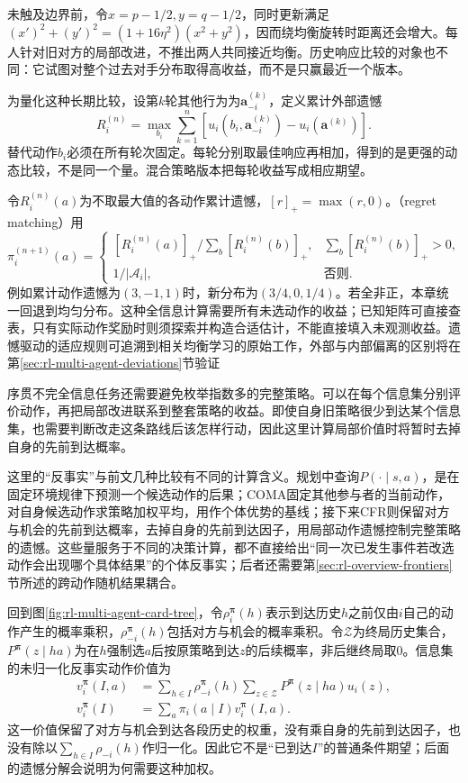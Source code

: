 未触及边界前，令$x=p-1/2,y=q-1/2$，同时更新满足
$(x')^2+(y')^2=(1+16\eta^2)(x^2+y^2)$，因而绕均衡旋转时距离还会增大。每人针对旧对方的局部改进，不推出两人共同接近均衡。历史响应比较的对象也不同：它试图对整个过去对手分布取得高收益，而不是只赢最近一个版本。

为量化这种长期比较，设第$k$轮其他行为为$\bm a_{-i}^{(k)}$，定义累计外部遗憾
\begin{equation}
 R_i^{(n)}
 =\max_{b_i}\sum_{k=1}^{n}
   [u_i(b_i,\bm a_{-i}^{(k)})
        -u_i(\bm a^{(k)})].
 \label{eq:rl-multi-agent-external-regret}
\end{equation}
替代动作$b_i$必须在所有轮次固定。每轮分别取最佳响应再相加，得到的是更强的动态比较，不是同一个量。混合策略版本把每轮收益写成相应期望。

令$R_i^{(n)}(a)$为不取最大值的各动作累计遗憾，$[r]_+=\max(r,0)$。（regret matching）用
\[
 \pi_i^{(n+1)}(a)=
 \begin{cases}
 [R_i^{(n)}(a)]_+/\sum_b[R_i^{(n)}(b)]_+,
       &\sum_b[R_i^{(n)}(b)]_+>0,\\
 1/|\mathcal A_i|,&\text{否则}.
 \end{cases}
\]
例如累计动作遗憾为$(3,-1,1)$时，新分布为$(3/4,0,1/4)$。若全非正，本章统一回退到均匀分布。这种全信息计算需要所有未选动作的收益；已知矩阵可直接查表，只有实际动作奖励时则须探索并构造合适估计，不能直接填入未观测收益。遗憾驱动的适应规则可追溯到相关均衡学习的原始工作，外部与内部偏离的区别将在第\ref{sec:rl-multi-agent-deviations}节验证

序贯不完全信息任务还需要避免枚举指数多的完整策略。可以在每个信息集分别评价动作，再把局部改进联系到整套策略的收益。即使自身旧策略很少到达某个信息集，也需要判断改走这条路线后该怎样行动，因此这里计算局部价值时将暂时去掉自身的先前到达概率。

这里的“反事实”与前文几种比较有不同的计算含义。规划中查询$P(\cdot\mid s,a)$，是在固定环境规律下预测一个候选动作的后果；COMA固定其他参与者的当前动作，对自身候选动作求策略加权平均，用作个体优势的基线；接下来CFR则保留对方与机会的先前到达概率，去掉自身的先前到达因子，用局部动作遗憾控制完整策略的遗憾。这些量服务于不同的决策计算，都不直接给出“同一次已发生事件若改选动作会出现哪个具体结果”的个体反事实；后者还需要第\ref{sec:rl-overview-frontiers}节所述的跨动作随机结果耦合。

回到图\ref{fig:rl-multi-agent-card-tree}，令$\rho_i^{\bm\pi}(h)$表示到达历史$h$之前仅由$i$自己的动作产生的概率乘积，$\rho_{-i}^{\bm\pi}(h)$包括对方与机会的概率乘积。令$\mathcal Z$为终局历史集合，$P^{\bm\pi}(z\mid ha)$为在$h$强制选$a$后按原策略到达$z$的后续概率，非后继终局取0。信息集的未归一化反事实动作价值为
\begin{align}
 v_i^{\bm\pi}(I,a)
 &=\sum_{h\in I}\rho_{-i}^{\bm\pi}(h)
         \sum_{z\in\mathcal Z}P^{\bm\pi}(z\mid ha)u_i(z),\\
 v_i^{\bm\pi}(I)&=\sum_a\pi_i(a\mid I)v_i^{\bm\pi}(I,a).
 \label{eq:rl-multi-agent-cfr-value}
\end{align}
这一价值保留了对方与机会到达各段历史的权重，没有乘自身的先前到达因子，也没有除以$\sum_{h\in I}\rho_{-i}(h)$作归一化。因此它不是“已到达$I$”的普通条件期望；后面的遗憾分解会说明为何需要这种加权。

